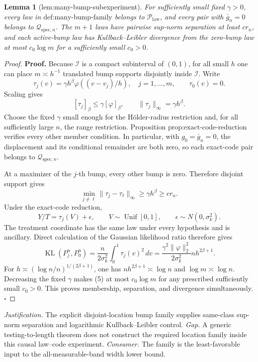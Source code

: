 \documentclass{article}
\newtheorem{lemma}{Lemma}
\begin{document}
\begin{lemma}[lem:many-bump-subexperiment]\label{lem:many-bump-subexperiment}
For sufficiently small fixed \(\gamma>0\), every law in \(\text{def:many-bump-family}\) belongs to \(\mathcal P_{\mathrm{law}}\), and every pair with \(\bar g_n=0\) belongs to \(\mathcal Q_{\mathrm{spec},n}\). The \(m+1\) laws have pairwise sup-norm separation at least \(c r_n\), and each active-bump law has Kullback--Leibler divergence from the zero-bump law at most \(c_0\log m\) for a sufficiently small \(c_0>0\).
\end{lemma}
\begin{proof}
\textbf{Proof.}
Because \(\mathcal I\) is a compact subinterval of \((0,1)\), for all small \(h\) one can place \(m\asymp h^{-1}\) translated bump supports disjointly inside \(\mathcal I\).  Write
\[
 \tau_j(v)=\gamma h^\beta\varphi((v-v_j)/h),
 \quad j=1,\ldots,m,
 \qquad \tau_0(v)=0. \tag{1}
\]
Scaling gives
\[
 [\tau_j]_\beta\le\gamma[\varphi]_\beta,
 \qquad \|\tau_j\|_\infty=\gamma h^\beta. \tag{2}
\]
Choose the fixed \(\gamma\) small enough for the H\"older-radius restriction and, for all sufficiently large \(n\), the range restriction.  Proposition \(\text{prop:exact-code-reduction}\) verifies every other member condition.  In particular, with \(g_0=\bar g_n=0\), the displacement and its conditional remainder are both zero, so each exact-code pair belongs to \(\mathcal Q_{\mathrm{spec},n}\).

At a maximizer of the \(j\)-th bump, every other bump is zero.  Therefore disjoint support gives
\[
 \min_{j\ne\ell}\|\tau_j-\tau_\ell\|_\infty
 \ge\gamma h^\beta\ge c r_n. \tag{3}
\]
Under the exact-code reduction,
\[
 Y/T=\tau_j(V)+\epsilon,
 \qquad V\sim\operatorname{Unif}[0,1],
 \qquad \epsilon\sim N(0,\sigma_k^2). \tag{4}
\]
The treatment coordinate has the same law under every hypothesis and is ancillary.  Direct calculation of the Gaussian likelihood ratio therefore gives
\[
 \operatorname{KL}(P_j^n,P_0^n)
 =\frac{n}{2\sigma_k^2}\int_0^1\tau_j(v)^2\,dv
 =\frac{\gamma^2\|\varphi\|_2^2}{2\sigma_k^2}nh^{2\beta+1}. \tag{5}
\]
For \(h\asymp(\log n/n)^{1/(2\beta+1)}\), one has
\(nh^{2\beta+1}\asymp\log n\) and \(\log m\asymp\log n\).  Decreasing the fixed \(\gamma\) makes (5) at most \(c_0\log m\) for any prescribed sufficiently small \(c_0>0\).  This proves membership, separation, and divergence simultaneously. \(\square\)
\end{proof}
\par\smallskip\noindent \textit{Justification.} The explicit disjoint-location bump family supplies same-class sup-norm separation and logarithmic Kullback--Leibler control. \textit{Gap.} A generic testing-to-length theorem does not construct the required location family inside this causal law--code experiment. \textit{Consumer.} The family is the least-favorable input to the all-measurable-band width lower bound.
\end{document}
